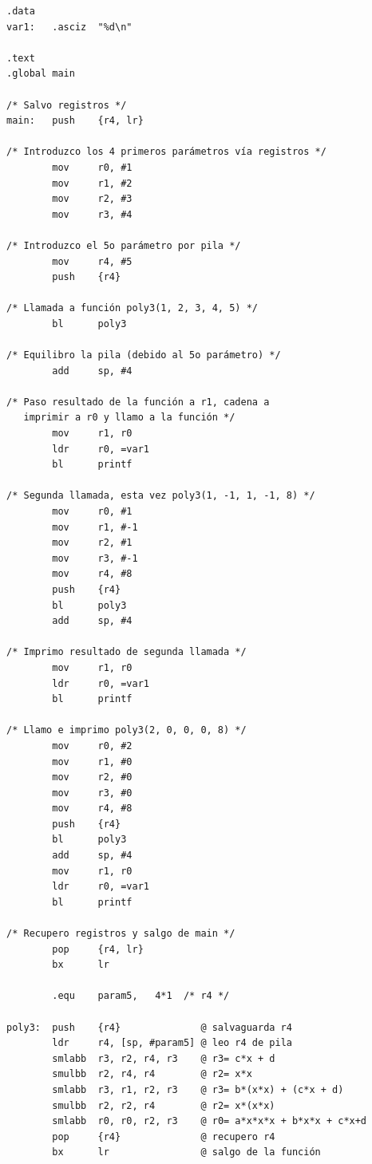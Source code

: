 \begin{lstlisting}[caption={Evaluador de polinomios subrut5.s},label={lst:codigoPract3_7}]
.data
var1:   .asciz  "%d\n"

.text
.global main

/* Salvo registros */
main:   push    {r4, lr}

/* Introduzco los 4 primeros parámetros vía registros */
        mov     r0, #1
        mov     r1, #2
        mov     r2, #3
        mov     r3, #4

/* Introduzco el 5o parámetro por pila */
        mov     r4, #5
        push    {r4}

/* Llamada a función poly3(1, 2, 3, 4, 5) */
        bl      poly3

/* Equilibro la pila (debido al 5o parámetro) */
        add     sp, #4

/* Paso resultado de la función a r1, cadena a
   imprimir a r0 y llamo a la función */
        mov     r1, r0
        ldr     r0, =var1
        bl      printf

/* Segunda llamada, esta vez poly3(1, -1, 1, -1, 8) */
        mov     r0, #1
        mov     r1, #-1
        mov     r2, #1
        mov     r3, #-1
        mov     r4, #8
        push    {r4}
        bl      poly3
        add     sp, #4

/* Imprimo resultado de segunda llamada */
        mov     r1, r0
        ldr     r0, =var1
        bl      printf

/* Llamo e imprimo poly3(2, 0, 0, 0, 8) */
        mov     r0, #2
        mov     r1, #0
        mov     r2, #0
        mov     r3, #0
        mov     r4, #8
        push    {r4}
        bl      poly3
        add     sp, #4
        mov     r1, r0
        ldr     r0, =var1
        bl      printf

/* Recupero registros y salgo de main */
        pop     {r4, lr}
        bx      lr

        .equ    param5,   4*1  /* r4 */

poly3:  push    {r4}              @ salvaguarda r4
        ldr     r4, [sp, #param5] @ leo r4 de pila
        smlabb  r3, r2, r4, r3    @ r3= c*x + d
        smulbb  r2, r4, r4        @ r2= x*x
        smlabb  r3, r1, r2, r3    @ r3= b*(x*x) + (c*x + d)
        smulbb  r2, r2, r4        @ r2= x*(x*x)
        smlabb  r0, r0, r2, r3    @ r0= a*x*x*x + b*x*x + c*x+d
        pop     {r4}              @ recupero r4
        bx      lr                @ salgo de la función
\end{lstlisting}

